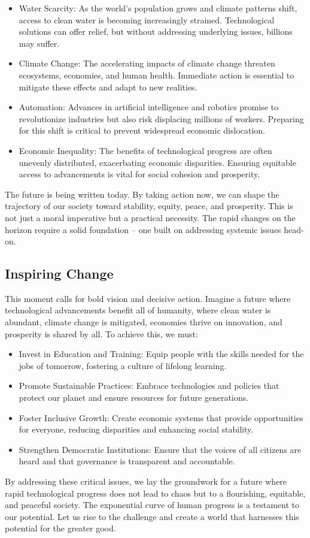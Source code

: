 \begin{itemize}
\item Water Scarcity: As the world's population grows and climate patterns shift, access to clean water is becoming increasingly strained.
Technological solutions can offer relief, but without addressing underlying issues, billions may suffer.
\item Climate Change: The accelerating impacts of climate change threaten ecosystems, economies, and human health.
Immediate action is essential to mitigate these effects and adapt to new realities.
\item Automation: Advances in artificial intelligence and robotics promise to revolutionize industries but also risk displacing millions of workers.
Preparing for this shift is critical to prevent widespread economic dislocation.
\item Economic Inequality: The benefits of technological progress are often unevenly distributed, exacerbating economic disparities.
Ensuring equitable access to advancements is vital for social cohesion and prosperity.
\end{itemize}
The future is being written today.
By taking action now, we can shape the trajectory of our society toward stability, equity, peace, and prosperity.
This is not just a moral imperative but a practical necessity.
The rapid changes on the horizon require a solid foundation -- one built on addressing systemic issues head-on.

\subsection*{Inspiring Change}
This moment calls for bold vision and decisive action.
Imagine a future where technological advancements benefit all of humanity, where clean water is abundant, climate change is mitigated, economies thrive on innovation, and prosperity is shared by all.
To achieve this, we must:

\begin{itemize}
\item Invest in Education and Training: Equip people with the skills needed for the jobs of tomorrow, fostering a culture of lifelong learning.
\item Promote Sustainable Practices: Embrace technologies and policies that protect our planet and ensure resources for future generations.
\item Foster Inclusive Growth: Create economic systems that provide opportunities for everyone, reducing disparities and enhancing social stability.
\item Strengthen Democratic Institutions: Ensure that the voices of all citizens are heard and that governance is transparent and accountable.
\end{itemize}
By addressing these critical issues, we lay the groundwork for a future where rapid technological progress does not lead to chaos but to a flourishing, equitable, and peaceful society.
The exponential curve of human progress is a testament to our potential.
Let us rise to the challenge and create a world that harnesses this potential for the greater good.

